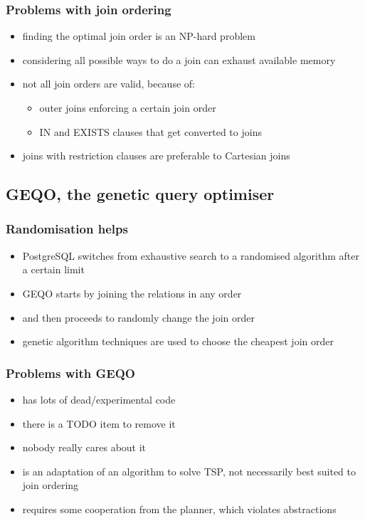\documentclass{beamer}
\begin{document}
\begin{frame}
  \frametitle{Problems with join ordering}

  \begin{itemize}
  \item finding the optimal join order is an NP-hard problem
  \item considering all possible ways to do a join can exhaust available memory
  \item not all join orders are valid, because of:
    \begin{itemize}
    \item outer joins enforcing a certain join order
    \item IN and EXISTS clauses that get converted to joins
    \end{itemize}
  \item joins with restriction clauses are preferable to Cartesian joins
  \end{itemize}
\end{frame}

\subsection{GEQO, the genetic query optimiser}

\begin{frame}
  \frametitle{Randomisation helps}

  \begin{itemize}
  \item PostgreSQL switches from exhaustive search to a randomised algorithm
    after a certain limit
  \item GEQO starts by joining the relations in any order
  \item and then proceeds to randomly change the join order
  \item genetic algorithm techniques are used to choose the cheapest join order
  \end{itemize}
\end{frame}

\begin{frame}
  \frametitle{Problems with GEQO}

  \begin{itemize}
  \item has lots of dead/experimental code
  \item there is a TODO item to remove it
  \item nobody really cares about it
  \item is an adaptation of an algorithm to solve TSP, not necessarily best
    suited to join ordering
  \item requires some cooperation from the planner, which violates abstractions
  \end{itemize}
\end{frame}
\end{document}
